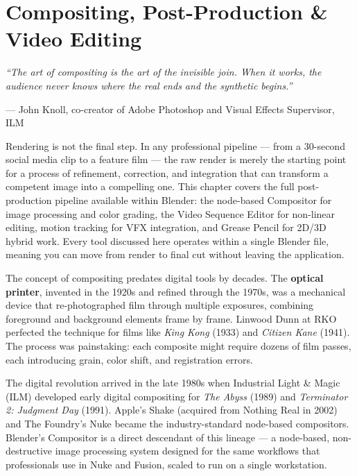 
\chapter{Compositing, Post-Production \& Video Editing}
\label{ch:compositing}

\begin{quotebox}
\itshape ``The art of compositing is the art of the invisible join. When it works, the audience never knows where the real ends and the synthetic begins.''

\upshape --- John Knoll, co-creator of Adobe Photoshop and Visual Effects Supervisor, ILM
\end{quotebox}

\vspace{1em}
Rendering is not the final step. In any professional pipeline --- from a 30-second social media clip to a feature film --- the raw render is merely the starting point for a process of refinement, correction, and integration that can transform a competent image into a compelling one. This chapter covers the full post-production pipeline available within Blender: the node-based Compositor for image processing and color grading, the Video Sequence Editor for non-linear editing, motion tracking for VFX integration, and Grease Pencil for 2D/3D hybrid work. Every tool discussed here operates within a single Blender file, meaning you can move from render to final cut without leaving the application.

\begin{historynote}
The concept of compositing predates digital tools by decades. The \textbf{optical printer}, invented in the 1920s and refined through the 1970s, was a mechanical device that re-photographed film through multiple exposures, combining foreground and background elements frame by frame. Linwood Dunn at RKO perfected the technique for films like \textit{King Kong} (1933) and \textit{Citizen Kane} (1941). The process was painstaking: each composite might require dozens of film passes, each introducing grain, color shift, and registration errors.

The digital revolution arrived in the late 1980s when Industrial Light \& Magic (ILM) developed early digital compositing for \textit{The Abyss} (1989) and \textit{Terminator 2: Judgment Day} (1991). Apple's Shake (acquired from Nothing Real in 2002) and The Foundry's Nuke became the industry-standard node-based compositors. Blender's Compositor is a direct descendant of this lineage --- a node-based, non-destructive image processing system designed for the same workflows that professionals use in Nuke and Fusion, scaled to run on a single workstation.
\end{historynote}

